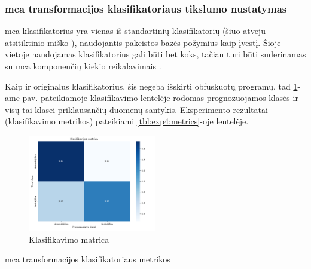 \subsubsection{\gls{mca} transformacijos klasifikatoriaus tikslumo nustatymas}\label{sec:exp:4}

\gls{mca} klasifikatorius yra vienas iš standartinių klasifikatorių (šiuo atveju atsitiktinio miško ), naudojantis pakeistos bazės požymius kaip įvestį. Šioje vietoje naudojamas klasifikatorius gali būti bet koks, tačiau turi būti suderinamas su \gls{mca} komponenčių kiekio reikalavimais . 

Kaip ir originalus klasifikatorius, šis negeba išskirti obfuskuotų programų, tad \ref{fig:exp4:confusion}-ame pav. pateikiamoje klasifikavimo lentelėje rodomas prognozuojamos klasės ir visų tai klasei priklausančių duomenų santykis.
Eksperimento rezultatai (klasifikavimo metrikos) pateikiami \ref{tbl:exp4:metrics}-oje lentelėje.
\begin{figure}[h]
    \centering
    \includegraphics[width=0.5\textwidth]{images/mca_2x2.png}
    \caption{Klasifikavimo matrica}
    \label{fig:exp4:confusion}
\end{figure}

\begin{table}[h]
    \caption{\gls{mca} transformacijos klasifikatoriaus metrikos}
    \centering
    \label{tbl:exp4:metrics}
\end{table}